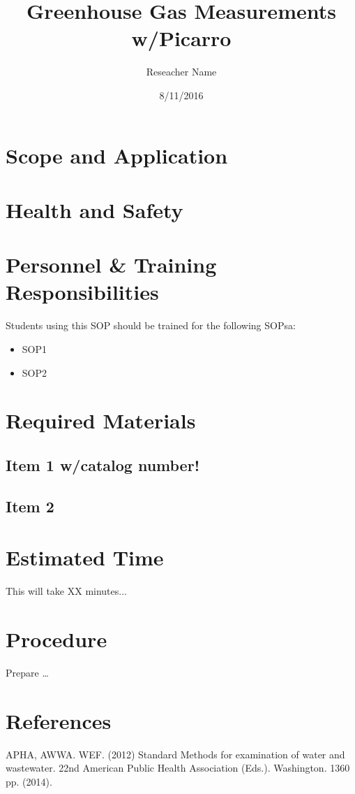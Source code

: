 \documentclass[12pt]{../SOP2}
\title{Greenhouse Gas Measurements w/Picarro}
\date{8/11/2016}
\author{Reseacher Name}
\begin{document}


\maketitle

\section{Scope and Application}

\NP \blindtext

\NP \lipsum[1]

\section{Health and Safety}

\NP \lipsum[2]


\section{Personnel \& Training Responsibilities}

\NP \lipsum[1]

Students using this SOP should be trained for the following SOPsa:

\begin{itemize}
  \item SOP1
  \item SOP2
\end{itemize}


\section{Required Materials}

\subsection{Item 1 w/catalog number!}
\subsection{Item 2}

\section{Estimated Time}

\NP This will take XX minutes...

\section{Procedure}

\NP Prepare \dots

\NP

\section{References}

\NP APHA, AWWA. WEF. (2012) Standard Methods for examination of water and wastewater. 22nd American Public Health Association (Eds.). Washington. 1360 pp. (2014).
\end{document}
